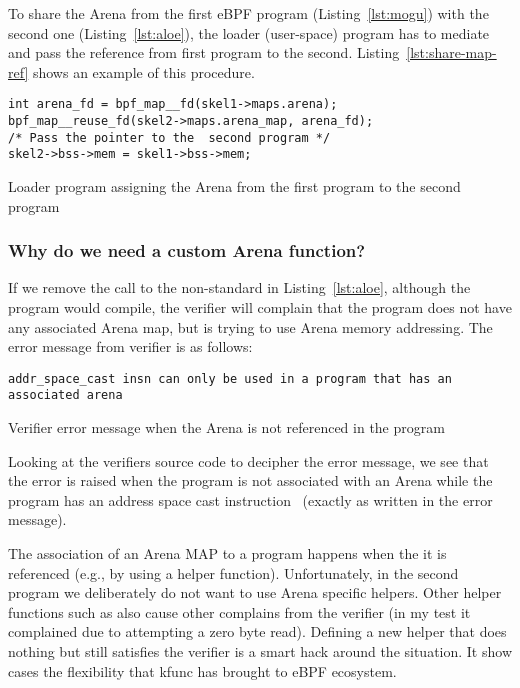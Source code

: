 \documentclass{article} \usepackage{graphicx}
\begin{document}
To share the Arena from the first eBPF program (Listing~\ref{lst:mogu})
with the second one (Listing~\ref{lst:aloe}), the loader (user-space) program
has to mediate and pass the reference from first program to the second.
Listing~\ref{lst:share-map-ref} shows an example of this procedure.

\begin{listing}
\begin{verbatim}
int arena_fd = bpf_map__fd(skel1->maps.arena);
bpf_map__reuse_fd(skel2->maps.arena_map, arena_fd);
/* Pass the pointer to the  second program */
skel2->bss->mem = skel1->bss->mem;
\end{verbatim}
\caption{Loader program assigning the Arena from the first program to the second program}
\label{lst:share-map-ref}
\end{listing}

\subsubsection{Why do we need a custom Arena function?}
\label{sec:need_custom}
If we remove the call to the non-standard  in
Listing~\ref{lst:aloe}, although the program would compile, the verifier will
complain that the program does not have any associated Arena map, but is trying
to use Arena memory addressing. The error message from verifier is as follows:

\begin{listing}
\begin{verbatim}
addr_space_cast insn can only be used in a program that has an associated arena
\end{verbatim}
\caption{Verifier error message when the Arena is not referenced in the program}
\label{lst:verifier_err_msg}
\end{listing}

Looking at the verifiers source code to decipher the error message, we see that
the error is raised when the program is not associated with an Arena while the
program has an address space cast instruction~\cite{verifier_arena_not_set}
(exactly as written in the error message).

The association of an Arena MAP to a program happens when the it is referenced
(e.g., by using a helper function). Unfortunately, in the second program we
deliberately do not want to use Arena specific helpers. Other helper functions
such as  also cause other complains from the verifier
(in my test it complained due to attempting a zero byte read). Defining a new
helper that does nothing but still satisfies the verifier is a smart hack
around the situation. It show cases the flexibility that kfunc has brought to
eBPF ecosystem.
\end{document}
